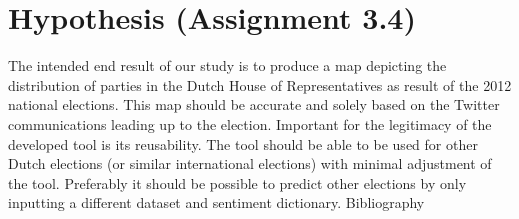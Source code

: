 \documentclass[a4paper]{report}
\begin{document}
\section*{Hypothesis (Assignment 3.4)}
The intended end result of our study is to produce a map depicting the distribution of parties in the Dutch House of Representatives as result of the 2012 national elections. This map should be accurate and solely based on the Twitter communications leading up to the election. Important for the legitimacy of the developed tool is its reusability. The tool should be able to be used for other Dutch elections (or similar international elections) with minimal adjustment of the tool. Preferably it should be possible to predict other elections by only inputting a different dataset and sentiment dictionary.
Bibliography
{}

\end{document}
